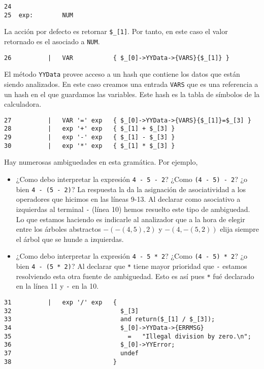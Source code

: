 \begin{verbatim}
24  
25  exp:        NUM
\end{verbatim}
La acción por defecto es retornar \verb|$_[1]|. 
Por tanto, en este caso el valor retornado es el asociado a \verb|NUM|.
\begin{verbatim}
26          |   VAR           { $_[0]->YYData->{VARS}{$_[1]} }
\end{verbatim}
El método \verb|YYData| provee acceso a un hash que contiene los datos 
que están siendo analizados. En este caso creamos una entrada
\verb|VARS| que es una referencia a un hash en el que guardamos las
variables. Este hash es la tabla de símbolos de la calculadora.
\begin{verbatim}
27          |   VAR '=' exp   { $_[0]->YYData->{VARS}{$_[1]}=$_[3] }
28          |   exp '+' exp   { $_[1] + $_[3] }
29          |   exp '-' exp   { $_[1] - $_[3] }
30          |   exp '*' exp   { $_[1] * $_[3] }
\end{verbatim}
Hay numerosas ambiguedades en esta gramática. Por ejemplo,

\begin{itemize}
\item
¿Como debo interpretar la expresión \verb|4 - 5 - 2|?
¿Como \verb|(4 - 5) - 2|? ¿o bien \verb|4 - (5 - 2)|?
La respuesta la da la asignación de asociatividad a los operadores
que hicimos en las líneas 9-13.
Al declarar como asociativo a izquierdas al terminal \verb|-| 
(línea 10) hemos 
resuelto este tipo de ambiguedad. Lo que estamos haciendo es
indicarle al analizador que a la hora de elegir entre 
los árboles abstractos 
$-(-(4,5),2)$ y $-(4, -(5,2))$ elija siempre
el árbol que se hunde a izquierdas.
\item
¿Como debo interpretar la expresión \verb|4 - 5 * 2|?
¿Como \verb|(4 - 5) * 2|? ¿o bien \verb|4 - (5 * 2)|?
Al declarar que \verb|*| tiene mayor prioridad que \verb|-| estamos
resolviendo esta otra fuente de ambiguedad. Esto es así pues
\verb|*| fué declarado en la línea 11 y \verb|-| en la 10.
\end{itemize}

\begin{verbatim}
31          |   exp '/' exp   {
32                              $_[3]
33                              and return($_[1] / $_[3]);
34                              $_[0]->YYData->{ERRMSG}
35                                =   "Illegal division by zero.\n";
36                              $_[0]->YYError;
37                              undef
38                            }
\end{verbatim}

